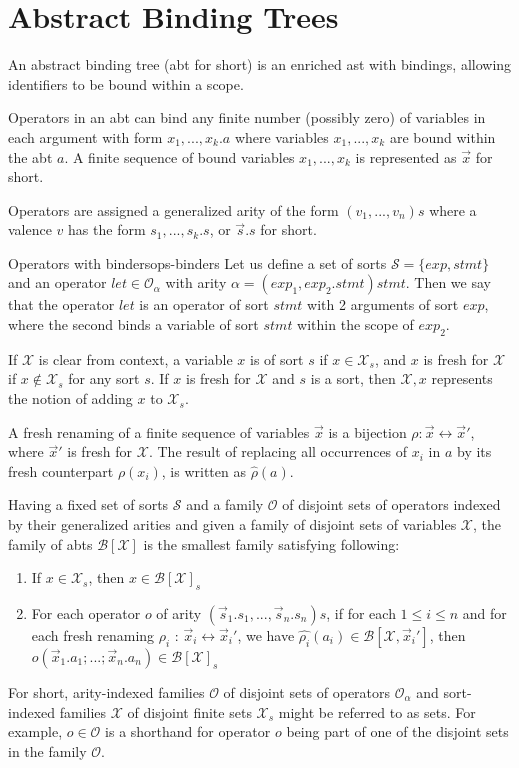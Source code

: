 \section{Abstract Binding Trees}
An abstract binding tree (abt for short) is an enriched ast with bindings, allowing identifiers to be bound within a scope.

Operators in an abt can bind any finite number (possibly zero) of variables in each argument with form $x_1,...,x_k.a$ where variables $x_1,...,x_k$ are bound within the abt $a$. A finite sequence of bound variables $x_1,...,x_k$ is represented as $\vec{x}$ for short.

Operators are assigned a generalized arity of the form $(v_1,...,v_n)s$ where a valence $v$ has the form $s_1,...,s_k.s$, or $\Vec{s}.s$ for short.

\begin{example}{Operators with binders}{ops-binders}
    Let us define a set of sorts $\mathcal{S} = \{ exp, stmt \}$ and an operator $let \in \mathcal{O}_\alpha$ with arity $\alpha = (exp_1,exp_2.stmt)stmt$. Then we say that the operator $let$ is an operator of sort $stmt$ with 2 arguments of sort $exp$, where the second binds a variable of sort $stmt$ within the scope of $exp_2$.
\end{example}

If $\mathcal{X}$ is clear from context, a variable $x$ is of sort $s$ if $x \in \mathcal{X}_s$, and $x$ is fresh for $\mathcal{X}$ if $x \notin \mathcal{X}_s$ for any sort $s$. If $x$ is fresh for $\mathcal{X}$ and $s$ is a sort, then $\mathcal{X},x$ represents the notion of adding $x$ to $\mathcal{X}_s$.

A fresh renaming of a finite sequence of variables $\vec{x}$ is a bijection $\rho: \vec{x} \leftrightarrow \vec{x}'$, where $\vec{x}'$ is fresh for $\mathcal{X}$. The result of replacing all occurrences of $x_i$ in $a$ by its fresh counterpart $\rho(x_i)$, is written as $\hat{\rho}(a)$.

Having a fixed set of sorts $\mathcal{S}$ and a family $\mathcal{O}$ of disjoint sets of operators indexed by their generalized arities and given a family of disjoint sets of variables $\mathcal{X}$, the family of abts $\mathcal{B}[\mathcal{X}]$ is the smallest family satisfying following:

\begin{enumerate}
    \item If $x \in \mathcal{X}_s$, then $x \in \mathcal{B}[\mathcal{X}]_s$
    \item For each operator $o$ of arity $(\vec{s}_1.s_1,...,\vec{s}_n.s_n)s$, if for each $1 \leq i \leq n$ and for each fresh renaming $\rho_i$ : $\vec{x}_i \leftrightarrow \vec{x}_i'$, we have $\hat{\rho_i}(a_i) \in \mathcal{B}[\mathcal{X}, \vec{x}_i']$, then $o(\vec{x}_1.a_1;...;\vec{x}_n.a_n) \in \mathcal{B}[\mathcal{X}]_s$
\end{enumerate}

For short, arity-indexed families $\mathcal{O}$ of disjoint sets of operators $\mathcal{O}_\alpha$ and sort-indexed families $\mathcal{X}$ of disjoint finite sets $\mathcal{X}_s$ might be referred to as sets. For example, $o \in \mathcal{O}$ is a shorthand for operator $o$ being part of one of the disjoint sets in the family $\mathcal{O}$.